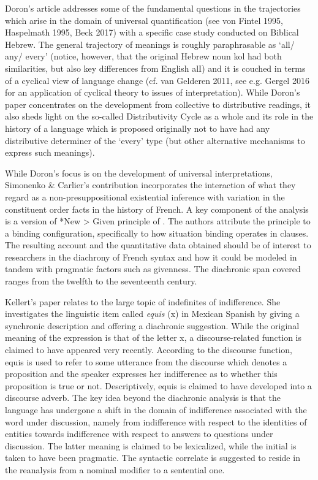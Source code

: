 \documentclass[output=paper]{langsci/langscibook}
\begin{document}
Doron’s article addresses some of the fundamental questions in the trajectories which arise in the domain of universal quantification (see von Fintel 1995, Haspelmath 1995, Beck 2017) with a specific case study conducted on Biblical Hebrew. The general trajectory of meanings is roughly paraphrasable as ‘all/ any/ every’ (notice, however, that the original Hebrew noun kol had both similarities, but also key differences from English alI) and it is couched in terms of a cyclical view of language change (cf. van Gelderen 2011, see e.g. Gergel 2016 for an application of cyclical theory to issues of interpretation). While Doron’s paper concentrates on the development from collective to distributive readings, it also sheds light on the so-called Distributivity Cycle as a whole and its role in the history of a language which is proposed originally not to have had any distributive determiner of the ‘every’ type (but other alternative mechanisms to express such meanings).

While Doron’s focus is on the development of universal interpretations, Simonenko \& Carlier’s contribution incorporates the interaction of what they regard as a non-presuppositional existential inference with variation in the constituent order facts in the history of French. A key component of the analysis is a version of *New > Given principle of \citet{Kucero2012}. The authors attribute the principle to a binding configuration, specifically to how situation binding operates in clauses. The resulting account and the quantitative data obtained should be of interest to researchers in the diachrony of French syntax and how it could be modeled in tandem with pragmatic factors such as givenness. The diachronic span covered ranges from the twelfth to the seventeenth century.

Kellert’s paper relates to the large topic of indefinites of indifference. She investigates the linguistic item called \textit {equis} (x) in Mexican Spanish by giving a synchronic description and offering a diachronic suggestion. While the original meaning of the expression is that of the letter x, a discourse-related function is claimed to have appeared very recently.  According to the discourse function, equis is used to refer to some utterance from the discourse which denotes a proposition and the speaker expresses her indifference as to whether this proposition is true or not. Descriptively, equis is claimed to have developed into a discourse adverb. The key idea beyond the diachronic analysis is that the language has undergone a shift in the domain of indifference associated with the word under discussion, namely from indifference with respect to the identities of entities towards indifference with respect to answers to questions under discussion. The latter meaning is claimed to be lexicalized, while the initial is taken to have been pragmatic. The syntactic correlate is suggested to reside in the reanalysis from a nominal modifier to a sentential one.
\end{document}
